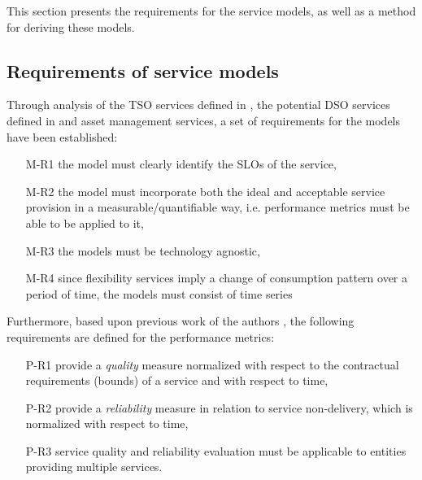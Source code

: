 This section presents the requirements for the service models, as well as a method for deriving these models.

\subsection{Requirements of service models}
Through analysis of the TSO services defined in \cite{EnerginetAncillary}, the potential DSO services defined in \cite{ding2013development} and asset management services, a set of requirements for the models have been established:
\begin{itemize}
    \item[M-R1] the model must clearly identify the SLOs of the service,
    \item[M-R2] the model must incorporate both the ideal and acceptable service provision in a measurable/quantifiable way, i.e. performance metrics must be able to be applied to it,
    \item[M-R3] the models must be technology agnostic,
    \item[M-R4] since flexibility services imply a change of consumption pattern over a period of time, the models must consist of time series
\end{itemize}

Furthermore, based upon previous work of the authors \cite{bondy2014performance}, the following requirements are defined for the performance metrics:
\begin{itemize}
	\item[P-R1] provide a \emph{quality} measure normalized with respect to the contractual requirements (bounds) of a service and with respect to time,
	\item[P-R2] provide a \emph{reliability} measure in relation to service non-delivery, which is normalized with respect to time,
	\item[P-R3] service quality and reliability evaluation must be applicable to entities providing multiple services.
\end{itemize}








